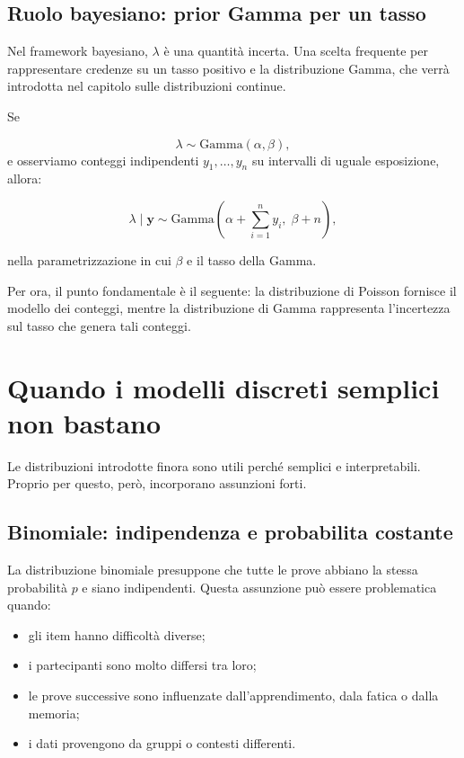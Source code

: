 \documentclass[
  italian,
  letterpaper,
  a4paper,
  11pt,
  open=any]{scrbook}
\providecommand{\tightlist}{%
  \setlength{\itemsep}{0pt}\setlength{\parskip}{0pt}}
\theoremstyle{plain}
\theoremstyle{definition}
\theoremstyle{definition}
\theoremstyle{remark}
\begin{document}
\subsection{Ruolo bayesiano: prior Gamma per un
tasso}\label{ruolo-bayesiano-prior-gamma-per-un-tasso}

Nel framework bayesiano, \(\lambda\) è una quantità incerta. Una scelta
frequente per rappresentare credenze su un tasso positivo e la
distribuzione Gamma, che verrà introdotta nel capitolo sulle
distribuzioni continue.

Se

\[
\lambda \sim \mathrm{Gamma}(\alpha,\beta),
\] e osserviamo conteggi indipendenti \(y_1,\ldots,y_n\) su intervalli
di uguale esposizione, allora:

\[
\lambda \mid \mathbf{y}
\sim
\mathrm{Gamma}\left(\alpha + \sum_{i=1}^n y_i,\; \beta+n\right),
\]

nella parametrizzazione in cui \(\beta\) e il tasso della Gamma.

Per ora, il punto fondamentale è il seguente: la distribuzione di
Poisson fornisce il modello dei conteggi, mentre la distribuzione di
Gamma rappresenta l'incertezza sul tasso che genera tali conteggi.

\section{Quando i modelli discreti semplici non
bastano}\label{sec-discrete-model-checks}

Le distribuzioni introdotte finora sono utili perché semplici e
interpretabili. Proprio per questo, però, incorporano assunzioni forti.

\subsection{Binomiale: indipendenza e probabilita
costante}\label{binomiale-indipendenza-e-probabilita-costante}

La distribuzione binomiale presuppone che tutte le prove abbiano la
stessa probabilità \(p\) e siano indipendenti. Questa assunzione può
essere problematica quando:

\begin{itemize}
\tightlist
\item
  gli item hanno difficoltà diverse;
\item
  i partecipanti sono molto differsi tra loro;
\item
  le prove successive sono influenzate dall'apprendimento, dala fatica o
  dalla memoria;
\item
  i dati provengono da gruppi o contesti differenti.
\end{itemize}
\end{document}
